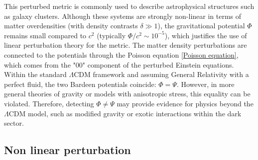 This perturbed metric is commonly used to describe astrophysical structures such as galaxy clusters. Although these systems are strongly non-linear in terms of matter overdensities (with density contrasts $\delta \gg 1$), the gravitational potential $\Phi$ remains small compared to $c^2$ (typically $\Phi/c^2 \sim 10^{-5}$), which justifies the use of linear perturbation theory for the metric.
The matter density perturbations are connected to the potentials through the Poisson equation \eqref{Poisson equation}, which comes from the "00" component of the perturbed Einstein equations.
Within the standard $\Lambda$CDM framework and assuming General Relativity with a perfect fluid, the two Bardeen potentials coincide: $\Phi = \Psi$. However, in more general theories of gravity or models with anisotropic stress, this equality can be violated. Therefore, detecting $\Phi \ne \Psi$ may provide evidence for physics beyond the $\Lambda$CDM model, such as modified gravity or exotic interactions within the dark sector.

\subsection{Non linear perturbation}

